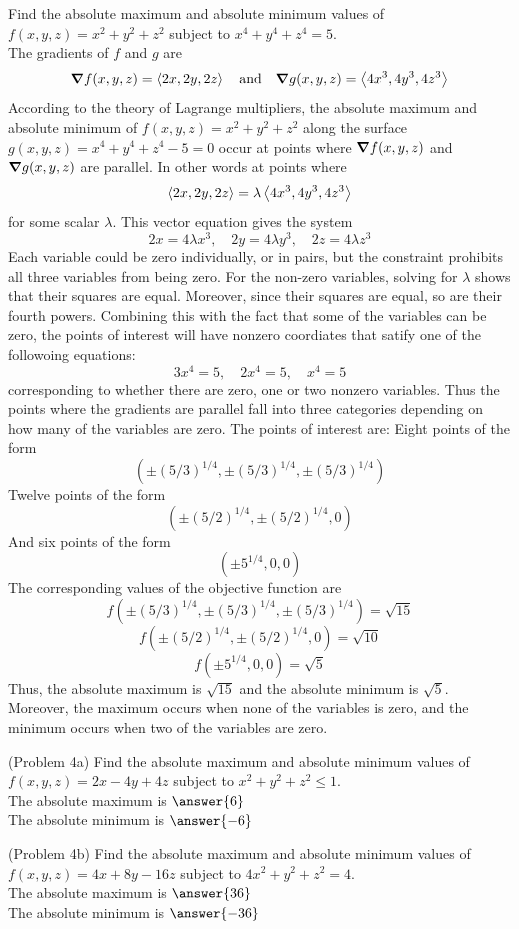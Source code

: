 \documentclass[handout]{ximera}
\begin{document}
\begin{example}[Example 4]
Find the absolute maximum and absolute minimum values 
of $f(x,y, z) = x^2 + y^2 + z^2$ subject to $x^4 + y^4 + z^4  = 5$.\\
The gradients of $f$ and $g$ are
\[
\boldsymbol\nabla f(x,y, z) = \left\langle 2x, 2y, 2z\right\rangle \quad \text{and} \quad \boldsymbol\nabla g(x,y, z) = \left\langle 4x^3, 4y^3, 4z^3\right\rangle
\]
According to the theory of Lagrange multipliers, the absolute maximum and 
absolute minimum of $f(x,y, z) = x^2 + y^2 + z^2$
along the surface $g(x,y, z) = x^4 + y^4 + z^4 - 5 = 0$ occur at points 
where $\boldsymbol\nabla f(x,y, z)$ and $\boldsymbol\nabla g(x,y, z)$ are parallel.  
In other words at points where
\[
\left\langle 2x, 2y, 2z\right\rangle = \lambda \left\langle 4x^3, 4y^3, 4z^3\right\rangle
\]
for some scalar $\lambda$.  
This vector equation gives the system
\[
2x = 4\lambda x^3, \quad 2y = 4\lambda y^3, \quad 2z = 4\lambda z^3
\]
Each variable could be zero individually, or in pairs, but the constraint prohibits
all three variables from being zero. 
For the non-zero variables, solving for $\lambda$ shows that their squares are equal. 
Moreover, since their squares are equal, so are their fourth powers.
Combining this with the fact that some of the variables can be zero, 
the points of interest will have nonzero coordiates that satify one of the 
followoing equations:
\[3x^4 = 5, \quad 2x^4 = 5, \quad x^4 = 5\]
corresponding to whether there are zero, one or two nonzero variables.
Thus the points where the gradients are parallel fall 
into three categories depending on how many of the variables are zero.  
The points of interest are:
Eight points of the form
\[ 
(\pm (5/3)^{1/4}, \pm (5/3)^{1/4}, \pm (5/3)^{1/4})
\]
Twelve points of the form
\[
 (\pm (5/2)^{1/4}, \pm (5/2)^{1/4}, 0)
\]
And six points of the form
\[
 (\pm 5^{1/4}, 0, 0)
\]
The corresponding values of the objective function are
\[
 f(\pm (5/3)^{1/4}, \pm (5/3)^{1/4}, \pm (5/3)^{1/4}) = \sqrt{15}
\]
\[
f(\pm (5/2)^{1/4}, \pm (5/2)^{1/4}, 0) = \sqrt{10}
\]
\[
f(\pm 5^{1/4}, 0, 0) = \sqrt 5
\]
Thus, the absolute maximum is $\sqrt{15}$ and the absolute minimum is $\sqrt{5}$.  
Moreover, the maximum occurs when none of the variables is zero, 
and the minimum occurs when two of the variables are zero.            
\end{example}

\begin{problem}(Problem 4a)
Find the absolute maximum and absolute minimum values of $f(x,y, z) = 2x  -4y  +4z$ subject to $x^2 + y^2 + z^2 \leq 1$.\\
The absolute maximum is $\answer{6}$\\
The absolute minimum is $\answer{-6}$
\end{problem}

\begin{problem}(Problem 4b)
Find the absolute maximum and absolute minimum values of $f(x,y, z) = 4x + 8y - 16z$ subject to $4x^2 + y^2 + z^2 = 4$.\\
The absolute maximum is $\answer{36}$\\
The absolute minimum is $\answer{-36}$
\end{problem}
\end{document}
